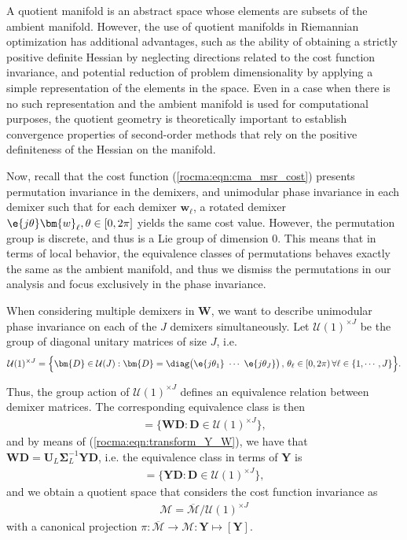 A quotient manifold is an abstract space whose elements are subsets of the ambient manifold. 
However, the use of quotient manifolds in Riemannian optimization has additional advantages, such as the ability of obtaining a strictly positive definite Hessian by neglecting directions related to the cost function invariance, and potential reduction of problem dimensionality by applying a simple representation of the elements in the space.
Even in a case when there is no such representation and the ambient manifold is used for computational purposes, the quotient geometry is theoretically important to establish convergence properties of second-order methods that rely on the positive definiteness of the Hessian on the manifold.

Now, recall that the cost function (\ref{rocma:eqn:cma_msr_cost}) presents permutation invariance in the demixers, and unimodular phase invariance in each demixer such that for each demixer $\bm{w}_{\ell}$, a rotated demixer $\e{j\theta}\bm{w}_{\ell}, \theta\in[0,2\pi]$ yields the same cost value.  However, the permutation group is discrete, and thus is a Lie group of dimension 0. This means that in terms of local behavior, the equivalence classes of permutations behaves exactly the same as the ambient manifold, and thus we dismiss the permutations in our analysis and focus exclusively in the phase invariance.

When considering multiple demixers in $\bm{W}$, we want to describe unimodular phase invariance on each of the $J$ demixers simultaneously. 
Let $\mathcal{U}(1)^{\times J}$ be the group of diagonal unitary matrices of size $J$, i.e.
\[\mathcal{U}(1)^{\times J} =\Big\{\bm{D}\in\mathcal{U}(J):\bm{D}=\diag\big(\e{j\theta_1}\,\,\cdots\,\,\e{j\theta_{J}}\big)\,,\,\theta_{\ell}\in[0,2\pi)\,\forall \ell\in\{1,\cdots,J\}\Big\}.\]

Thus, the group action of $\mathcal{U}(1)^{\times J}$ defines an equivalence relation between demixer matrices. 
The corresponding equivalence class is then
\begin{align}
	[\bm{W}]=\big\{\bm{W}\bm{D}:\bm{D}\in\mathcal{U}(1)^{\times J}\big\},\nonumber
\end{align}
and by means of (\ref{rocma:eqn:transform_Y_W}), we have that $\bm{W}\bm{D}=\bm{U}_L\bm{\Sigma}_L^{-1}\bm{Y}\bm{D}$, i.e. the equivalence class in terms of $\bm{Y}$ is 
\begin{align}
	[\bm{Y}]=\big\{\bm{Y}\bm{D}:\bm{D}\in\mathcal{U}(1)^{\times J}\big\}, \label{rocma:eqn:equivalenceclass}
\end{align}
and we obtain a quotient space that considers the cost function invariance as
\begin{align}
	\mathcal{M}= \overline{\mathcal{M}}/\mathcal{U}(1)^{\times J}
\end{align}
with a canonical projection $\pi:\overline{\mathcal{M}}\to\mathcal{M}:\bm{Y}\mapsto[\bm{Y}]$.

